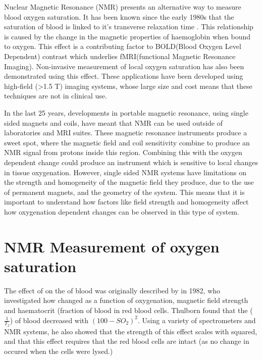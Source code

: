 Nuclear Magnetic Resonance (NMR) presents an alternative way to measure blood oxygen saturation.
It has been known since the early 1980s that the saturation of blood is linked to it's transverse relaxation time \Ttwo.
This relationship is caused by the change in the magnetic properties of haemoglobin when bound to oxygen.
This effect is a contributing factor to BOLD(Blood Oxygen Level Dependent) contrast which underlies fMRI(functional Magnetic Resonance Imaging).
Non-invasive measurement of local oxygen saturation has also been demonstrated using this effect.
These applications have been developed using high-field (>1.5 T) imaging systems, whose large size and cost means that these techniques are not in clinical use.

In the last 25 years, developments in portable magnetic resonance, using single sided magnets and coils, have meant that NMR can be used outside of laboratories and MRI suites.
These magnetic resonance instruments produce a sweet spot, where the magnetic field and coil sensitivity combine to produce an NMR signal from protons inside this region.
Combining this with the oxygen dependent \Ttwo change could produce an instrument which is sensitive to local changes in tissue oxygenation.
However, single sided NMR systems have limitations on the strength and homogeneity of the magnetic field they produce, due to the use of permanent magnets, and the geometry of the system.
This means that it is important to understand how factors like field strength and homogeneity affect how oxygenation dependent \Ttwo changes can be observed in this type of system.


\section{NMR Measurement of oxygen saturation}
The effect of \SOtwo on the \Ttwo of blood was originally described by \cite{ThulbornOxygenationdependencetransverse1982} in 1982, who investigated how \Ttwo changed as a function of oxygenation, magnetic field strength and haematocrit (fraction of blood in red blood cells.
Thulborn found that the \Rtwo ($\mathit{\frac{1}{T_2}}$) of blood decreased with $(100-\mathit{SO_2})^2$.
Using a variety of spectrometers and NMR systems, he also showed that the strength of this effect scales with \Bzero squared, and that this effect requires that the red blood cells are intact (as no change in \Ttwo occured when the cells were lysed.)

